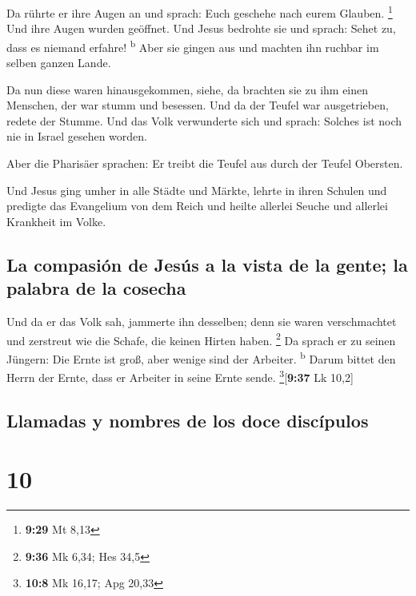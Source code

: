  Da rührte er ihre Augen an und sprach: Euch geschehe
nach eurem Glauben. \footnote{\textbf{9:29} Mt 8,13}  Und
ihre Augen wurden geöffnet. Und Jesus bedrohte sie und sprach: Sehet zu,
dass es niemand erfahre! \textsuperscript{b}  Aber sie
gingen aus und machten ihn ruchbar im selben ganzen Lande.

 Da nun diese waren hinausgekommen, siehe, da brachten
sie zu ihm einen Menschen, der war stumm und besessen. 
Und da der Teufel war ausgetrieben, redete der Stumme. Und das Volk
verwunderte sich und sprach: Solches ist noch nie in Israel gesehen
worden.

 Aber die Pharisäer sprachen: Er treibt die Teufel aus
durch der Teufel Obersten.

 Und Jesus ging umher in alle Städte und Märkte, lehrte
in ihren Schulen und predigte das Evangelium von dem Reich und heilte
allerlei Seuche und allerlei Krankheit im Volke.

\hypertarget{la-compasiuxf3n-de-jesuxfas-a-la-vista-de-la-gente-la-palabra-de-la-cosecha}{%
\subsection{La compasión de Jesús a la vista de la gente; la palabra de
la
cosecha}\label{la-compasiuxf3n-de-jesuxfas-a-la-vista-de-la-gente-la-palabra-de-la-cosecha}}

 Und da er das Volk sah, jammerte ihn desselben; denn sie
waren verschmachtet und zerstreut wie die Schafe, die keinen Hirten
haben. \footnote{\textbf{9:36} Mk 6,34; Hes 34,5}  Da
sprach er zu seinen Jüngern: Die Ernte ist groß, aber wenige sind der
Arbeiter. \textsuperscript{b}  Darum bittet den Herrn der
Ernte, dass er Arbeiter in seine Ernte sende.
\footnote{\textbf{10:8} Mk 16,17; Apg 20,33}{[}\textbf{9:37} Lk 10,2{]}

\hypertarget{llamadas-y-nombres-de-los-doce-discuxedpulos}{%
\subsection{Llamadas y nombres de los doce
discípulos}\label{llamadas-y-nombres-de-los-doce-discuxedpulos}}

\hypertarget{section-9}{%
\section{10}\label{section-9}}

